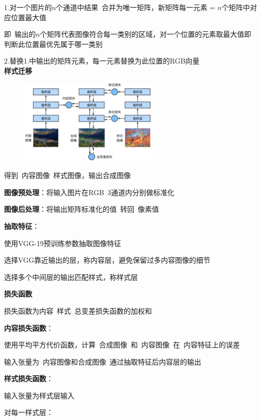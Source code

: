 \documentclass[UTF8]{ctexart}
\begin{document}
  \quad \quad 1.对一个图片的$n$个通道中结果\ 合并为唯一矩阵，新矩阵每一元素 = $n$个矩阵中对应位置最大值

  \quad \quad \quad 即\ 输出的$n$个矩阵代表图像符合每一类别的区域，对一个位置的元素取最大值即判断此位置最优先属于哪一类别
  
  \quad \quad 2.替换1.中输出的矩阵元素，每一元素替换为此位置的RGB向量\\
\textbf{样式迁移}

  \begin{figure}[H] %
    \centering %
    \includegraphics[width=0.6\textwidth]{note_images/style-transfer.png} %
  \end{figure}

  得到\ 内容图像\ 样式图像，输出合成图像

  \textbf{图像预处理}：将输入图片在RGB\ 3通道内分别做标准化

  \textbf{图像后处理}：将输出矩阵标准化的值\ 转回\ 像素值

  \textbf{抽取特征}：

  \quad 使用VGG-19预训练参数抽取图像特征

  \quad \quad 选择VGG靠近输出的层，称内容层，避免保留过多内容图像的细节

  \quad \quad 选择多个中间层的输出匹配样式，称样式层

  \textbf{损失函数}

  \quad 损失函数为内容\ 样式\ 总变差损失函数的加权和

  \quad \textbf{内容损失函数}：

  \quad \quad 使用平均平方代价函数，计算\ 合成图像\ 和\ 内容图像\ 在\ 内容特征上的误差

  \quad \quad 输入张量为\ 内容图像和合成图像\ 通过抽取特征后内容层的输出

  \quad \textbf{样式损失函数}：

  \quad \quad 输入张量为样式层输入

  \quad \quad 对每一样式层：
\end{document}
